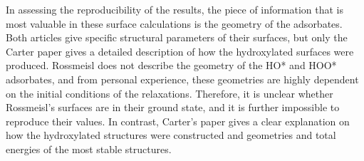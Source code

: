 \documentclass[11pt]{article}
\begin{document}
  In assessing the reproducibility of the results, the piece of
  information that is most valuable in these surface calculations is
  the geometry of the adsorbates.
  Both articles give specific structural parameters of their surfaces,
  but only the Carter paper gives a detailed description of how the 
  hydroxylated surfaces were produced. 
  Rossmeisl does not describe the geometry of the HO* and HOO*
  adsorbates, and from personal experience, these geometries are 
  highly dependent on the initial conditions of the relaxations. 
  Therefore, it is unclear whether Rossmeisl's surfaces are in their
  ground state, and it is further impossible to reproduce their
  values.
  In contrast, Carter's paper gives a clear explanation on how the
  hydroxylated structures were constructed and geometries and total
  energies of the most stable structures.
\end{document}
